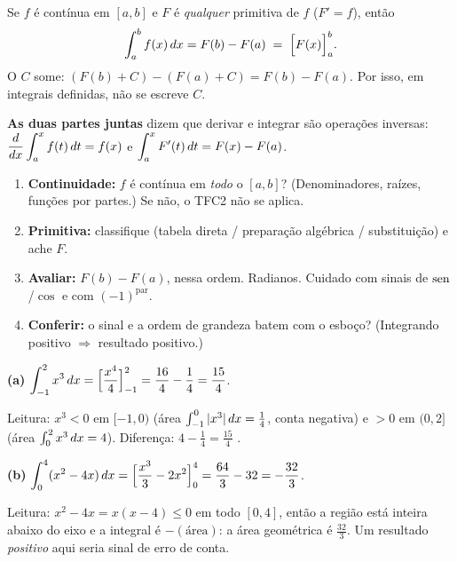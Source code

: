 \begin{definicao}
Se $f$ é contínua em $[a,b]$ e $F$ é \emph{qualquer} primitiva de $f$ ($F'=f$), então
\[
\int_a^b f(x)\,dx=F(b)-F(a)\;=\;\Big[F(x)\Big]_a^b .
\]
O $C$ some: $(F(b)+C)-(F(a)+C)=F(b)-F(a)$. Por isso, em integrais definidas, não se escreve $C$.

\textbf{As duas partes juntas} dizem que derivar e integrar são operações inversas:
$\dfrac{d}{dx}\displaystyle\int_a^x f(t)\,dt=f(x)$ \;e\; $\displaystyle\int_a^x F'(t)\,dt=F(x)-F(a)$.
\end{definicao}

\begin{metodo}
\begin{enumerate}[leftmargin=1.6em, itemsep=1pt]
\item \textbf{Continuidade:} $f$ é contínua em \emph{todo} o $[a,b]$? (Denominadores, raízes, funções por partes.) Se não, o TFC2 não se aplica.
\item \textbf{Primitiva:} classifique (tabela direta / preparação algébrica / substituição) e ache $F$.
\item \textbf{Avaliar:} $F(b)-F(a)$, nessa ordem. Radianos. Cuidado com sinais de $\operatorname{sen}$/$\cos$ e com $(-1)^{\text{par}}$.
\item \textbf{Conferir:} o sinal e a ordem de grandeza batem com o esboço? (Integrando positivo $\Rightarrow$ resultado positivo.)
\end{enumerate}
\end{metodo}

\begin{exemplo}
\textbf{(a)} $\displaystyle\int_{-1}^{2}x^3\,dx=\Big[\frac{x^4}{4}\Big]_{-1}^{2}=\frac{16}{4}-\frac{1}{4}=\frac{15}{4}$.

Leitura: $x^3<0$ em $[-1,0)$ (área $\int_{-1}^0|x^3|\,dx=\tfrac14$, conta negativa) e $>0$ em $(0,2]$ (área $\int_0^2x^3\,dx=4$). Diferença: $4-\tfrac14=\tfrac{15}{4}$ \ok.

\textbf{(b)} $\displaystyle\int_0^4(x^2-4x)\,dx=\Big[\frac{x^3}{3}-2x^2\Big]_0^4=\frac{64}{3}-32=-\frac{32}{3}$.

Leitura: $x^2-4x=x(x-4)\le0$ em todo $[0,4]$, então a região está inteira abaixo do eixo e a integral é $-(\text{área})$: a área geométrica é $\tfrac{32}{3}$. Um resultado \emph{positivo} aqui seria sinal de erro de conta.
\end{exemplo}

